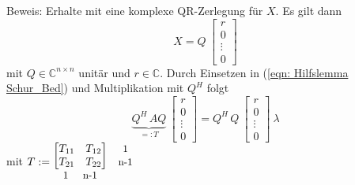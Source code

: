 \documentclass[a4paper,12pt]{report}
\newcommand{\C}{\mathbb C}
\theoremstyle{plain} %
\theoremstyle{definition} %
\theoremstyle{remark}
\begin{document}
            Beweis:
            Erhalte mit \cite[S. 233]{matrixGolub} eine komplexe QR-Zerlegung für $X$. Es gilt dann
            $$X = Q\ \begin{bmatrix}
                  r\\
                  0\\
                  \vdots\\
                  0
            \end{bmatrix}$$
            mit $Q\in \C^{n \times n}$ unitär und $r\in \C$.
            Durch Einsetzen in (\ref{eqn: Hilfslemma Schur_Bed}) und Multiplikation mit $Q^H$ folgt
            \begin{equation}
                  \label{eqn: Hilfslemma_Schur_Gl}
                  \underbrace{Q^H\,AQ}_{=:T}\ \begin{bmatrix}
                        r\\
                        0\\
                        \vdots\\
                        0
                  \end{bmatrix} = Q^H\,Q\ \begin{bmatrix}
                        r\\
                        0\\
                        \vdots\\
                        0
                  \end{bmatrix}\ \lambda
            \end{equation}
            mit $T:=\begin{matrix}
                  \begin{bmatrix}
                        T_{11} & T_{12}\\
                        T_{21} & T_{22}\\
                  \end{bmatrix} & \begin{matrix}
                  \text{\small 1} \\\text{\small{n-1}}
                  \end{matrix} \\
                  \begin{matrix}
                  \text{\small 1} &  \text{  \small{n-1}}\\
                  \end{matrix} &  \\
                  \end{matrix}$\\
\end{document}

